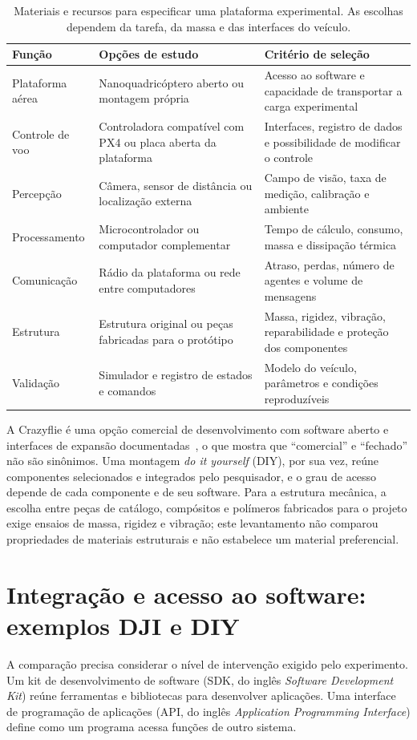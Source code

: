 \documentclass[11pt,a4paper,oneside]{book}
\numberwithin{equation}{chapter}
\begin{document}
\begin{table}[htbp]
\centering\small
\caption{Materiais e recursos para especificar uma plataforma experimental. As escolhas dependem da tarefa, da massa e das interfaces do veículo.}
\label{tab:materiais}
\begin{tabularx}{\textwidth}{@{}>{\raggedright\arraybackslash}p{3cm}YY@{}}
\toprule
Função & Opções de estudo & Critério de seleção \\
\midrule
Plataforma aérea & Nanoquadricóptero aberto ou montagem própria & Acesso ao software e capacidade de transportar a carga experimental \\
Controle de voo & Controladora compatível com PX4 ou placa aberta da plataforma & Interfaces, registro de dados e possibilidade de modificar o controle \\
Percepção & Câmera, sensor de distância ou localização externa & Campo de visão, taxa de medição, calibração e ambiente \\
Processamento & Microcontrolador ou computador complementar & Tempo de cálculo, consumo, massa e dissipação térmica \\
Comunicação & Rádio da plataforma ou rede entre computadores & Atraso, perdas, número de agentes e volume de mensagens \\
Estrutura & Estrutura original ou peças fabricadas para o protótipo & Massa, rigidez, vibração, reparabilidade e proteção dos componentes \\
Validação & Simulador e registro de estados e comandos & Modelo do veículo, parâmetros e condições reproduzíveis \\
\bottomrule
\end{tabularx}
\end{table}

A Crazyflie é uma opção comercial de desenvolvimento com software aberto e interfaces de expansão documentadas~\cite{bitcraze}, o que mostra que ``comercial'' e ``fechado'' não são sinônimos. Uma montagem \emph{do it yourself} (DIY), por sua vez, reúne componentes selecionados e integrados pelo pesquisador, e o grau de acesso depende de cada componente e de seu software. Para a estrutura mecânica, a escolha entre peças de catálogo, compósitos e polímeros fabricados para o projeto exige ensaios de massa, rigidez e vibração; este levantamento não comparou propriedades de materiais estruturais e não estabelece um material preferencial.

\section{Integração e acesso ao software: exemplos DJI e DIY}\label{sec:dji-diy}
A comparação precisa considerar o nível de intervenção exigido pelo experimento. Um kit de desenvolvimento de software (SDK, do inglês \emph{Software Development Kit}) reúne ferramentas e bibliotecas para desenvolver aplicações. Uma interface de programação de aplicações (API, do inglês \emph{Application Programming Interface}) define como um programa acessa funções de outro sistema.
\end{document}
